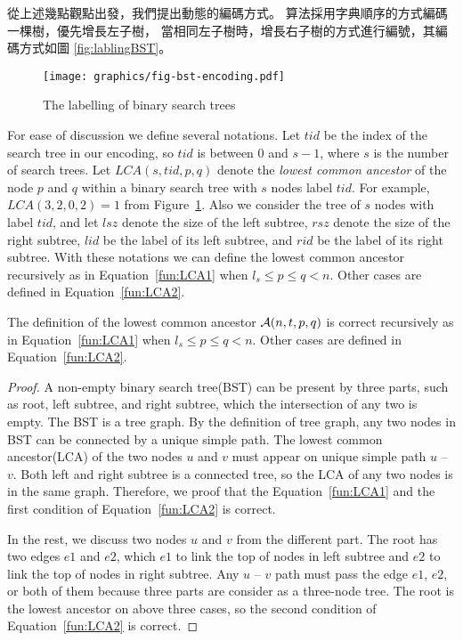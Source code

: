 從上述幾點觀點出發，我們提出動態的編碼方式。
算法採用字典順序的方式編碼一棵樹，優先增長左子樹，
當相同左子樹時，增長右子樹的方式進行編號，其編碼方式如圖 \ref{fig:lablingBST}。
\fi

\begin{figure}[!thb]
  \centering
  \texttt{[image: graphics/fig-bst-encoding.pdf]}
  \caption{The labelling of binary search trees}
  \label{fig:labelingBST}
\end{figure}

For ease of discussion we define several notations.  Let
$\mathit{tid}$ be the index of the search tree in our encoding, so
$\mathit{tid}$ is between 0 and $s - 1$, where $s$ is the number of
search trees.  Let $\mathit{LCA}(s, \mathit{tid}, p, q)$ denote the
{\em lowest common ancestor} of the node $p$ and $q$ within a binary
search tree with $s$ nodes label $\mathit{tid}$.  For example,
$\mathit{LCA}(3, 2, 0, 2) = 1$ from Figure~\ref{fig:labelingBST}.
Also we consider the tree of $s$ nodes with label $\mathit{tid}$, and
let $\mathit{lsz}$ denote the size of the left subtree, $\mathit{rsz}$
denote the size of the right subtree, $\mathit{lid}$ be the label of
its left subtree, and $\mathit{rid}$ be the label of its right
subtree.  With these notations we can define the lowest common
ancestor recursively as in Equation~\ref{fun:LCA1} when $l_s \le
  p \le q < n$.  Other cases are defined in Equation~\ref{fun:LCA2}. 



\begin{theorem} \label{thm:LCA-correctness}

  The definition of the lowest common ancestor ${\cal A}(n, t, p, q)$ is
correct recursively as in Equation~\ref{fun:LCA1} when $l_s \le   p \le
q < n$.  Other cases are defined in Equation~\ref{fun:LCA2}.

\end{theorem}
\begin{proof}

A non-empty binary search tree(BST) can be present by three parts, such
as root, left subtree, and right subtree, which the intersection of any
two is empty.  The BST is a tree graph. By the definition of tree graph,
any two nodes in BST can be connected by a unique simple path.  The
lowest common ancestor(LCA) of the two nodes $u$ and $v$ must appear on
unique simple path $u$  -- $v$.  Both left and right subtree is a
connected tree, so the LCA of any two nodes is in the same graph.
Therefore, we proof that the Equation~\ref{fun:LCA1} and the first
condition of Equation~\ref{fun:LCA2} is correct.

In the rest, we discuss two nodes $u$ and $v$ from the different part.
The root has two edges $e1$ and $e2$, which $e1$ to link the top of
nodes in left subtree and $e2$ to link the top of nodes in right
subtree.  Any $u$ -- $v$ path must pass the edge $e1$, $e2$, or both of
them because three parts are consider as a three-node tree.  The root is
the lowest ancestor on above three cases, so the second condition of
Equation~\ref{fun:LCA2} is correct.

\end{proof}

